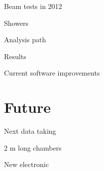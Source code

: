 \documentclass[10pt]{beamer}
\begin{document}
\begin{frame}{Beam tests in 2012}
\end{frame}

\begin{frame}{Showers}
\end{frame}

\begin{frame}{Analysis path}
\end{frame}
\begin{frame}{Results}
\end{frame}

\begin{frame}{Current software improvements}
\end{frame}

\section{Future}

\begin{frame}{Next data taking}
\end{frame}

\begin{frame}{2 m long chambers}
\end{frame}

\begin{frame}{ New electronic}
\end{frame}
\end{document}
